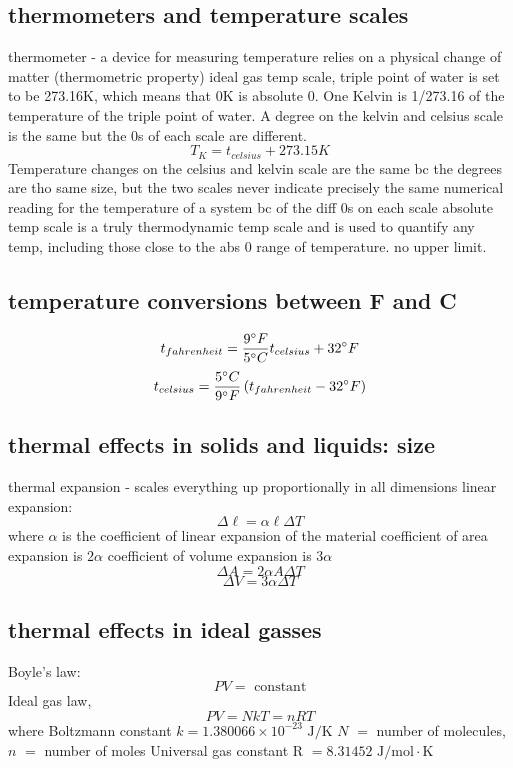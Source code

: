 \documentclass{article}
\begin{document}
\subsection{thermometers and temperature scales}
\begin{outline}
\1 thermometer - a device for measuring temperature
\1 relies on a physical change of matter (thermometric property)
\1 ideal gas temp scale, triple point of water is set to be 273.16K, which means that 0K is absolute 0.
\1 One Kelvin is 1/273.16 of the temperature of the triple point of water.
\1 A degree on the kelvin and celsius scale is the same but the 0s of each scale are different. \[T_K=t_{celsius}+273.15 K\]
\1 Temperature changes on the celsius and kelvin scale are the same bc the degrees are tho same size, but the two scales never indicate precisely the same numerical reading for the temperature of a system bc of the diff 0s on each scale
\1 absolute temp scale is a truly thermodynamic temp scale and is used to quantify any temp, including those close to the abs 0 range of temperature. no upper limit.
\end{outline}
\subsection{temperature conversions between F and C}
\begin{outline}
\0 \[t_{fahrenheit}=\dfrac{9\degree F}{5\degree C}t_{celsius}+32\degree F\]
\0 \[t_{celsius}=\dfrac{5\degree C}{9\degree F}\left(t_{fahrenheit} - 32\degree F\right)\]
\end{outline}
\subsection{thermal effects in solids and liquids: size}
\begin{outline}
\1 thermal expansion - scales everything up proportionally in all dimensions
\1 linear expansion: \[\Delta\ell=\alpha\ell\Delta T\] where $\alpha$ is the coefficient of linear expansion of the material
\1 coefficient of area expansion is $2\alpha$
\1 coefficient of volume expansion is $3\alpha$
\0 \[\Delta A=2\alpha A\Delta T\] \[\Delta V=3\alpha\Delta T\]
\end{outline}
\subsection{thermal effects in ideal gasses}
\begin{outline}
\1 Boyle's law: \[PV=\text{ constant}\]
\1 Ideal gas law, \[PV=NkT=nRT\] where Boltzmann constant $k=1.380066\times10^{-23}\text{ J/K}$
\1 $N$ $=$ number of molecules, $n$ $=$ number of moles
\1 Universal gas constant R $= 8.31452 \text{ J/mol}\cdot\text{K}$
\end{outline}
\end{document}
